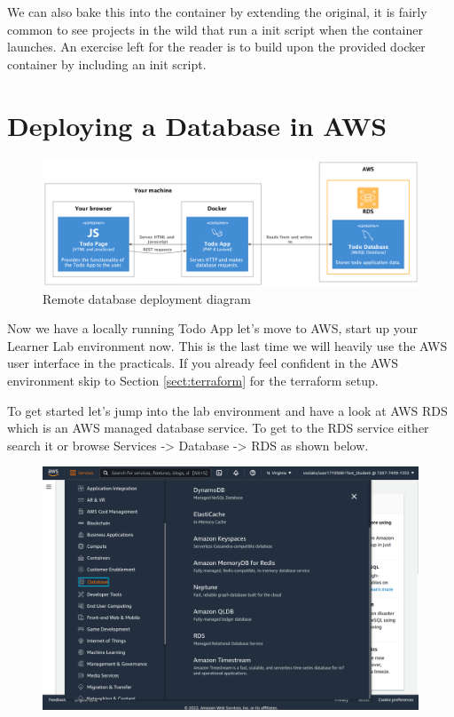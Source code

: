 \documentclass{csse4400}
\begin{document}
We can also bake this into the container by extending the original,
it is fairly common to see projects in the wild that run a init script when the container launches.
An exercise left for the reader is to build upon the provided docker container by including an init script.

\section{Deploying a Database in AWS}

\begin{figure}[ht]
\includegraphics[width=\textwidth]{diagrams/remotedb}
\caption{Remote database deployment diagram}
\end{figure}

Now we have a locally running Todo App let's move to AWS,
start up your Learner Lab environment now.
This is the last time we will heavily use the AWS user interface in the practicals.
If you already feel confident in the AWS environment skip to Section \ref{sect:terraform} for the terraform setup.


To get started let's jump into the lab environment and have a look at AWS RDS which is an AWS managed database service.
To get to the RDS service either search it or browse Services -> Database -> RDS as shown below.

\begin{figure}[H]
\includegraphics[width=\textwidth]{images/aws_1}
\end{figure}
\end{document}
